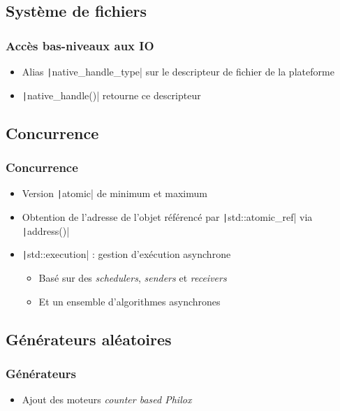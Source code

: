 \documentclass[C++.tex]{subfiles}
\begin{document}
\subsection*{Système de fichiers}
\begin{frame}[fragile]
	\frametitle{Accès bas-niveaux aux IO}
	\begin{itemize}
		\item Alias \texttt|native_handle_type| sur le descripteur de fichier de la plateforme
		\item \texttt|native_handle()| retourne ce descripteur
	\end{itemize}

\end{frame}

\subsection*{Concurrence}
\begin{frame}[fragile]
	\frametitle{Concurrence}
	\begin{itemize}
		\item Version \texttt|atomic| de minimum et maximum
		\item Obtention de l'adresse de l'objet référencé par \texttt|std::atomic_ref| via \texttt|address()|
		\item \texttt|std::execution| : gestion d'exécution asynchrone
		\begin{itemize}
			\item Basé sur des \textit{schedulers}, \textit{senders} et \textit{receivers}
			\item Et un ensemble d'algorithmes asynchrones
		\end{itemize}
	\end{itemize}

\end{frame}

\subsection*{Générateurs aléatoires}
\begin{frame}[fragile]
	\frametitle{Générateurs}
	\begin{itemize}
		\item Ajout des moteurs \textit{counter based Philox}
	\end{itemize}

\end{frame}
\end{document}

